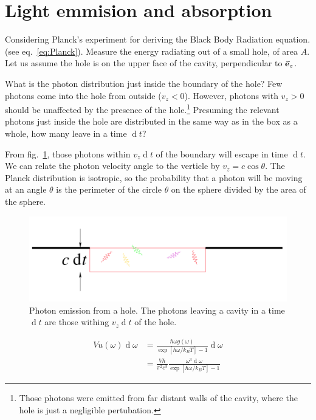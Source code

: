 \documentclass[11pt,letterpaper]{article}
\renewcommand{\d}[1]{\ensuremath{\operatorname{d}\!{#1}}}
\numberwithin{equation}{section}
\numberwithin{figure}{section}
\begin{document}

\section{Light emmision and absorption}


Considering Planck's experiment for deriving the Black Body Radiation equation. (see eq.~\ref{eq:Planck}). Measure the energy radiating out of a small hole, of area $A$. Let us assume the hole is on the upper face of the cavity, perpendicular to $\va{e}_z$.

What is the photon distribution just inside the boundary of the hole? Few photons come into the hole from outside ($v_z < 0$). However, photons with $v_z > 0$ should be unaffected by the presence of the hole.\footnote{Those photons were emitted from far distant walls of the cavity, where the hole is just a negligible pertubation.} Presuming the relevant photons just inside the hole are distributed in the same way as in the box as a whole, how many leave in a time $\d{t}$?

From fig.~\ref{fig:2}, those photons within $v_z\d{t}$ of the boundary will escape in time $\d{t}$. We can relate the photon velocity angle to the verticle by $v_z = c\cos\theta$. The Planck distribution is isotropic, so the probability that a photon will be moving at an angle $\theta$ is the perimeter of the circle $\theta$ on the sphere divided by the area of the sphere.


\begin{figure}[h!]
\centering
\includegraphics[width=.5\linewidth]{PSet4_Fig2}
\caption{Photon emission from a hole. The photons leaving a cavity in a time $\d{t}$ are those withing $v_z\d{t}$ of the hole.}\label{fig:2}
\end{figure}

\begin{equation}
\begin{aligned}
V u(\omega) \d{\omega}&
= \frac{\hbar \omega g(\omega)}{\exp[\hbar\omega/k_BT] - 1} \d{\omega}
\\
&
= \frac{V\hbar}{\pi^2c^3}\frac{\omega^3 \d{\omega}}{\exp[\hbar\omega/k_BT] - 1}
\label{eq:Planck}
\end{aligned}
\end{equation}
\begin{center}
\end{center}
\end{document}
